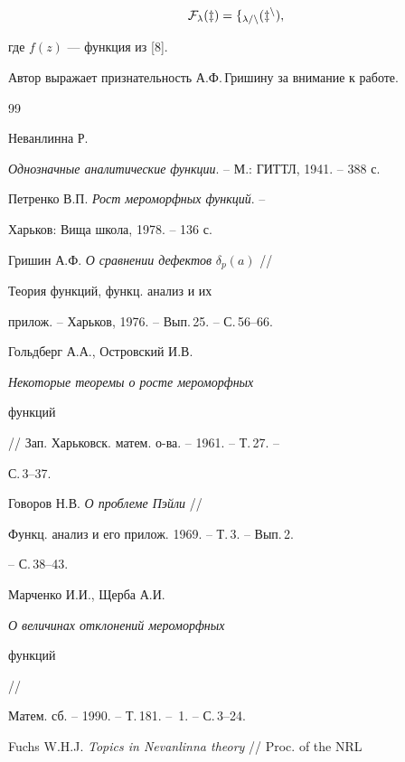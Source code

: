 $$ 


\cal F_\lambda(z)=f_{\lambda/n}(z^n), 


$$ 


где $f(z)$ --- функция из [8]. 


 


Автор выражает признательность А.Ф.\,Гришину за внимание к работе. 


 


\begin{thebibliography}{99} 


 




Неванлинна Р. 


{\em Однозначные аналитические функции}. -- М.: ГИТТЛ, 1941. -- 388 с. 




Петренко В.П. {\em Рост мероморфных функций}. -- 


Харьков: Вища школа, 1978. -- 136 с. 




Гришин А.Ф. {\em О сравнении дефектов} $\delta_p(a)$ // 


Теория функций, функц. анализ и их 


прилож. -- Харьков, 1976. -- Вып.\,25. -- С.\,56--66. 




Гольдберг А.А., Островский И.В. 


{\em Некоторые теоремы о росте мероморфных 


функций} // Зап. Харьковск. матем. о-ва. -- 1961. -- Т.\,27. -- 


С.\,3--37. 




Говоров Н.В. {\em О проблеме Пэйли} // 


Функц. анализ и его прилож. 1969. -- Т.\,3. -- Вып.\,2. 


-- С.\,38--43. 




Марченко И.И., Щерба А.И. {\em О величинах отклонений мероморфных 


функций} // 


Матем. сб. -- 1990. -- Т.\,181. -- \No\,1. -- С.\,3--24. 




Fuchs W.H.J. {\em Topics in Nevanlinna theory} // Proc. of the NRL 



\end{thebibliography}
